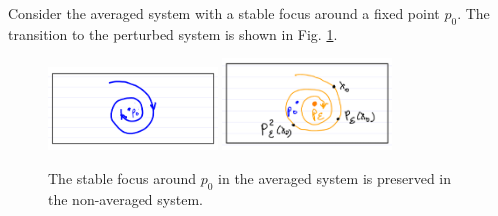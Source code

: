 \begin{ex}
	Consider the averaged system with a stable focus around a fixed point $p_0 $. The transition to the perturbed system is shown in Fig. \ref{fig:avg_ex_3a}.
	\begin{figure}[h!]
		\centering
		\includegraphics[width=0.4\textwidth]{figures/ch5/6avg_ex_3a.png}
		\includegraphics[width=0.4\textwidth]{figures/ch5/7avg_ex_3b.png}
		\caption{The stable focus around $p_0$ in the averaged system is preserved in the non-averaged system.}
		\label{fig:avg_ex_3a}
	\end{figure}
	
\end{ex}

